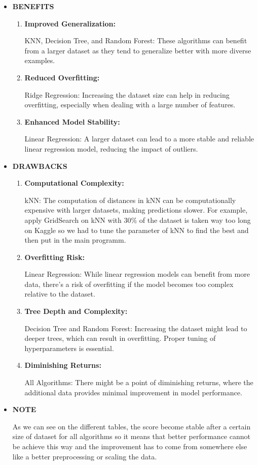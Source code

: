 \documentclass[12pt, titlepage]{article}
\begin{document}
\begin{itemize}
    \item 
    \textbf{BENEFITS}
    \begin{enumerate}
        \item 
        \textbf{Improved Generalization:}

KNN, Decision Tree, and Random Forest: These algorithms can benefit from a larger dataset as they tend to generalize better with more diverse examples.

\item 
\textbf{Reduced Overfitting:}

Ridge Regression: Increasing the dataset size can help in reducing overfitting, especially when dealing with a large number of features.
\item 
\textbf{Enhanced Model Stability:}

Linear Regression: A larger dataset can lead to a more stable and reliable linear regression model, reducing the impact of outliers.
    \end{enumerate}

    \item 
    \textbf{DRAWBACKS}
    \begin{enumerate}
        \item 
        \textbf{Computational Complexity:}

kNN: The computation of distances in kNN can be computationally expensive with larger datasets, making predictions slower. For example, apply GridSearch on kNN with 30\% of the dataset is taken way too long on Kaggle so we had to tune the parameter of kNN to find the best and then put in the main programm.
        \item 
\textbf{Overfitting Risk:}

Linear Regression: While linear regression models can benefit from more data, there's a risk of overfitting if the model becomes too complex relative to the dataset.
        \item 
\textbf{Tree Depth and Complexity:}

Decision Tree and Random Forest: Increasing the dataset might lead to deeper trees, which can result in overfitting. Proper tuning of hyperparameters is essential.
        \item 
\textbf{Diminishing Returns:}

All Algorithms: There might be a point of diminishing returns, where the additional data provides minimal improvement in model performance.
    \end{enumerate}

    \item 
    \textbf{NOTE} 
    
    As we can see on the different tables, the score become stable after a certain size of dataset for all algorithms so it means that better performance cannot be achieve this way and the improvement has to come from somewhere else like a better preprocessing or scaling the data.
\end{itemize}
\end{document}
